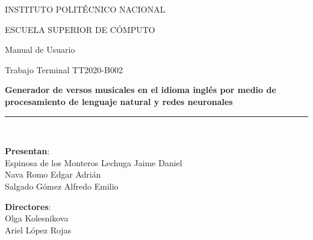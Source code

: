 \documentclass[12pt, a4paper, titlepage]{report}
\begin{document}
\begin{titlepage}
		\vspace*{.25cm}								%
		
		\begin{center}
			
			\begin{LARGE}
				\textcolor{guindapoli}{INSTITUTO POLITÉCNICO NACIONAL}\\
			\end{LARGE}	
			
			\vspace*{0.2in}
			
			\begin{Large}
				\textcolor{azulescom}{ESCUELA SUPERIOR DE CÓMPUTO}\\
			\end{Large}	
		
			\vspace*{0.4in}
			
			\begin{large}
				Manual de Usuario\\
			\end{large}	
			
			\vspace*{0.4in}
			
			\begin{large}
				Trabajo Terminal TT2020-B002\\
			\end{large}
			
			\vspace*{0.2in}
			
			\begin{Large}
				\textbf{Generador de versos musicales en el idioma
					inglés por medio de procesamiento de lenguaje
					natural y redes neuronales}\\
			\end{Large}
						
			\vspace*{0.2in}
			
			\rule{80mm}{.1mm}\\
			\vspace*{0.1in}
			
			\begin{large}
				\begin{center}
					\textbf{Presentan}:\\
					Espinosa de los Monteros Lechuga Jaime Daniel\\
					Nava Romo Edgar Adrián\\
					Salgado Gómez Alfredo Emilio\\
				\end{center}
			\end{large}
			
			\begin{large}
				\textbf{Directores}:\\
				Olga Kolesnikova\\
				Ariel López Rojas\\
			\end{large}
			
		\end{center}
		
	\end{titlepage}
	
\end{document}
